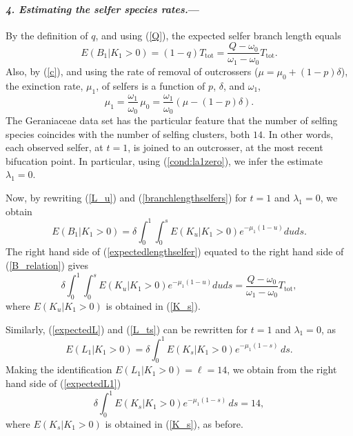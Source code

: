 \documentclass[a4paper,11pt]{article}
\theoremstyle{plain}
\theoremstyle{definition}
\numberwithin{equation}{section}
\begin{document}
\paragraph{\textit{4. Estimating the selfer species rates.}---} 
By the definition of $q$, and using (\ref{Q}), the expected selfer
branch length equals
\begin{equation}\label{B_relation}
E(B_1|K_1>0)=(1-q)T_\mathrm{tot}=\frac{Q-\omega_0}{\omega_1-\omega_0}T_\mathrm{tot}.
\end{equation}
Also, by (\ref{c}), and using the rate of removal 
of outcrossers ($\mu=\mu_0 + (1-p)\delta$), 
the exinction rate, $\mu_1$, of
selfers is a function of $p$, $\delta$, and $\omega_1$,  
\begin{equation}\label{mu1}
\mu_1=\frac{\omega_1}{\omega_0}\,\mu_0=\frac{\omega_1}{\omega_0}(\mu-(1-p)\delta). 
\end{equation} 
The Geraniaceae data set has the particular feature that
the number of selfing species coincides with the number of selfing
clusters, both $14$. In other words, each observed selfer, at
$t=1$, is joined to an outcrosser, at
the most recent bifucation point. In
particular, using (\ref{cond:la1zero}), we infer the estimate
$\lambda_1=0$. 

Now, by rewriting (\ref{L_u}) and (\ref{branchlengthselfers}) for $t=1$ and 
$\lambda_1=0$, we obtain  
\begin{equation}
E(B_1|K_1>0)=\delta\int_0^1\int_0^s E(K_u|K_1>0) e^{-\mu_1(1-u)}duds.
 \label{expectedlengthselfer}
\end{equation}
The right hand side of (\ref{expectedlengthselfer}) equated to the right hand side of
(\ref{B_relation}) gives
\begin{equation}
\delta \int_0^1\int_0^s E(K_u|K_1>0)e^{-\mu_1(1-u)}duds
=\frac{Q-\omega_0}{\omega_1-\omega_0}T_\mathrm{tot},
\label{Bcheck}
\end{equation}
where $E(K_u|K_1>0)$ is obtained in (\ref{K_s}). 

Similarly, (\ref{expectedL}) and (\ref{L_ts}) can be rewritten for $t=1$ and 
$\lambda_1=0$, as
\begin{equation} 
E(L_1|K_1>0) =\delta\int_0^1 E(K_s|K_1>0)e^{-\mu_1(1-s)}\,ds.
\label{expectedL1}
\end{equation}
Making the identification $E(L_1|K_1>0)=\ell=14$, we obtain from 
the right hand side of (\ref{expectedL1})
\begin{equation}\label{ellcheck}
\delta\int_0^1 E(K_s|K_1>0)e^{-\mu_1(1-s)}\,ds=14,
\end{equation}
where $E(K_s|K_1>0)$ is obtained in (\ref{K_s}), as before. 
\end{document}
